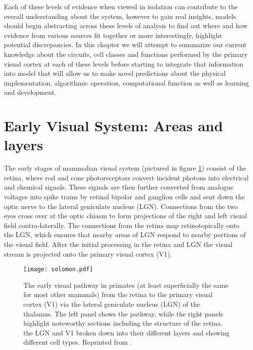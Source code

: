 Each of these levels of evidence when viewed in isolation can
contribute to the overall understanding about the system, however to
gain real insights, models should begin abstracting across these
levels of analysis to find out where and how evidence from various
sources fit together or more interestingly, highlight potential
discrepancies. In this chapter we will attempt to summarize our
current knowledge about the circuits, cell classes and functions
performed by the primary visual cortex at each of these levels before
starting to integrate that information into model that will allow us
to make novel predictions about the physical implementation,
algorithmic operation, computational function as well as learning and
development.

\section{Early Visual System: Areas and layers}

The early stages of mammalian visual system (pictured in figure
\ref{VisualSystem}) consist of the retina, where rod and cone
photoreceptors convert incident photons into electrical and chemical
signals. These signals are then further converted from analogue
voltages into spike trains by retinal bipolar and ganglion cells and
sent down the optic nerve to the lateral geniculate nucleus
(LGN). Connections from the two eyes cross over at the optic chiasm to
form projections of the right and left visual field
contra-laterally. The connections from the retina map retinotopically
onto the LGN, which ensures that nearby areas of LGN respond to nearby
portions of the visual field. After the initial processing in the
retina and LGN the visual stream is projected onto the primary visual
cortex (V1).

\begin{figure}
	\centering
        \texttt{[image: solomon.pdf]}
	\caption[A diagram of early visual pathway in mammals, reproduced
      from \cite{Solomon2007}.]{The early visual pathway in primates
      (at least superficially the same for most other mammals) from
      the retina to the primary visual cortex (V1) via the lateral
      geniculate nucleus (LGN) of the thalamus. The left panel shows
      the pathway, while the right panels highlight noteworthy
      sections including the structure of the retina, the LGN and V1
      broken down into their different layers and showing different
      cell types. Reprinted from \cite{Solomon2007}.}
	\label{VisualSystem}
\end{figure}

